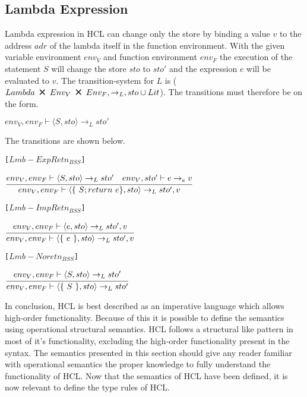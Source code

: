 \subsection{Lambda Expression}
Lambda expression in HCL can change only the store by binding a value $v$ to the address $adr$ of the lambda itself in the function environment.
With the given variable environment $env_V$ and function environment $env_F$ the execution of the statement $S$ will change the store $sto$ to $sto'$ and the expression $e$ will be evaluated to $v$.
The transition-system for $L$ is ($Lambda\ \Cross\ Env_V\ \Cross\ Env_F, \rightarrow_L, sto \cup Lit$).
The transitions must therefore be on the form.
\begin{center}
	$env_V, env_F \vdash \langle S, sto \rangle \rightarrow_L sto'$
\end{center}

The transitions are shown below.

\texttt{[$Lmb-ExpRetn_{BSS}$]}
\begin{center}
	\begin{math}
		\cfrac
			{env_V, env_F \vdash \langle S, sto \rangle \rightarrow_L sto' \quad env_V, sto' \vdash e \rightarrow_e v}
			{env_V, env_F \vdash \langle \{\ S;return\ e \}, sto \rangle \rightarrow_L sto', v}
	\end{math}
\end{center}

\texttt{[$Lmb-ImpRetn_{BSS}$]}
\begin{center}
	\begin{math}
	\cfrac
	{env_V, env_F \vdash \langle e, sto \rangle \rightarrow_L sto', v}
	{env_V, env_F \vdash \langle \{\ e\ \}, sto \rangle \rightarrow_L sto', v}
	\end{math}
\end{center}

\texttt{[$Lmb-Noretn_{BSS}$]}
\begin{center}
	\begin{math}
		\cfrac
			{env_V, env_F \vdash \langle S, sto \rangle \rightarrow_L sto'}
			{env_V, env_F \vdash \langle \{\ S\ \}, sto \rangle \rightarrow_L sto'}
	\end{math}
\end{center}

In conclusion, HCL is best described as an imperative language which allows high-order functionality. 
Because of this it is possible to define the semantics using operational structural semantics.
HCL follows a structural like pattern in most of it's functionality, excluding the high-order functionality present in the syntax.
The semantics presented in this section should give any reader familiar with operational semantics the proper knowledge to fully understand the functionality of HCL.
Now that the semantics of HCL have been defined, it is now relevant to define the type rules of HCL.
